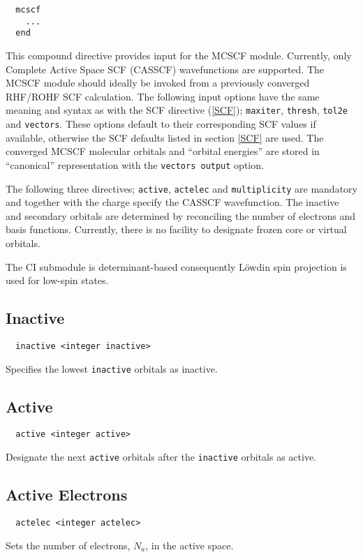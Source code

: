 \label{sec:mcscf}
\begin{verbatim}
  mcscf
    ...
  end
\end{verbatim}

This compound directive provides input for the MCSCF module.
Currently, only Complete Active Space SCF (CASSCF) wavefunctions are
supported. The MCSCF module should ideally be invoked from a previously
converged RHF/ROHF SCF calculation.
The following input options have the same meaning
and syntax as with the SCF directive (\ref{SCF}); \verb+maxiter+,
\verb+thresh+, \verb+tol2e+ and \verb+vectors+.  These options default to
their corresponding SCF values if available, otherwise the SCF defaults
listed in section \ref{SCF} are used. The converged MCSCF molecular
orbitals and ``orbital energies'' are stored in ``canonical''
representation with the \verb+vectors output+ option.

The following three directives; \verb+active+, \verb+actelec+ and
\verb+multiplicity+ are mandatory and together with the charge specify
the CASSCF wavefunction. The inactive and secondary orbitals are
determined by reconciling the number of electrons and basis
functions. Currently, there is no facility to designate frozen core or
virtual orbitals. 

The CI submodule is determinant-based consequently L\"owdin spin
projection is used for low-spin states.

\subsection{Inactive}
\begin{verbatim}
  inactive <integer inactive>
\end{verbatim}
Specifies the lowest \verb+inactive+ orbitals as inactive.

\subsection{Active}
\begin{verbatim}
  active <integer active>
\end{verbatim}
Designate the next \verb+active+ orbitals after the \verb+inactive+
orbitals as active. 

\subsection{Active Electrons}
\begin{verbatim}
  actelec <integer actelec>
\end{verbatim}
Sets the number of electrons, $N_{a}$, in the active space.

